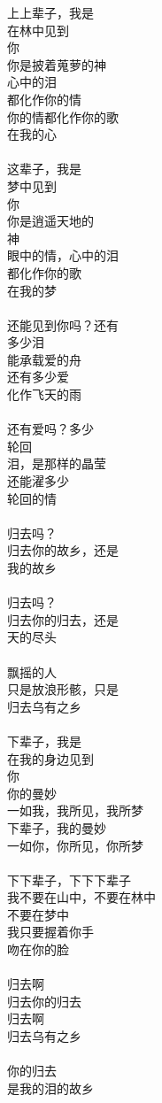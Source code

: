 上上辈子，我是\\
在林中见到\\
你\\
你是披着蒐萝的神\\
心中的泪\\
都化作你的情\\
你的情都化作你的歌\\
在我的心\\
\\
这辈子，我是\\
梦中见到\\
你\\
你是逍遥天地的\\
神\\
眼中的情，心中的泪\\
都化作你的歌\\
在我的梦\\
\\
还能见到你吗？还有\\
多少泪\\
能承载爱的舟\\
还有多少爱\\
化作飞天的雨\\
\\
还有爱吗？多少\\
轮回\\
泪，是那样的晶莹\\
还能濯多少\\
轮回的情\\
\\
归去吗？\\
归去你的故乡，还是\\
我的故乡\\
\\
归去吗？\\
归去你的归去，还是\\
天的尽头\\
\\
飘摇的人\\
只是放浪形骸，只是\\
归去乌有之乡\\
\\
下辈子，我是\\
在我的身边见到\\
你\\
你的曼妙\\
一如我，我所见，我所梦\\
下辈子，我的曼妙\\
一如你，你所见，你所梦\\
\\
下下辈子，下下下辈子\\
我不要在山中，不要在林中\\
不要在梦中\\
我只要握着你手\\
吻在你的脸\\
\\
归去啊\\
归去你的归去\\
归去啊\\
归去乌有之乡\\
\\
你的归去\\
是我的泪的故乡
